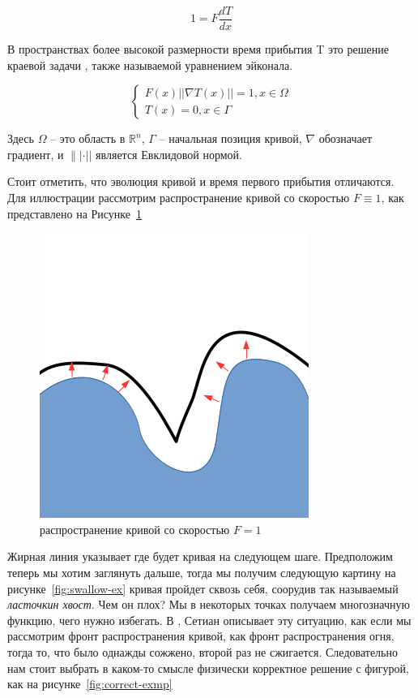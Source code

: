 \begin{equation*}
  1 = F \frac{dT}{dx}
\end{equation*}

В пространствах более высокой размерности время прибытия T это решение
краевой задачи , также называемой уравнением эйконала.

\begin{equation}
  \label{eq:eikonal}
  \left\{ \begin{matrix}
      F(x) || \nabla T(x) || = 1, x \in \Omega \\
      T(x) = 0, x \in \Gamma
    \end{matrix}\right.
\end{equation}

Здесь $\Omega$ -- это область в $\mathbb{R}^n$, $\Gamma$ -- начальная
позиция кривой, $\nabla$ обозначает градиент, и $\|| \cdot ||$ является
Евклидовой нормой.

Стоит отметить, что эволюция кривой и время первого прибытия
отличаются. Для иллюстрации рассмотрим распространение кривой со
скоростью $F \equiv 1$, как представлено на Рисунке~\ref{fig:prpgt-eik}

\begin{figure}[h]
  \centering
  \includegraphics[width=0.3\linewidth]{img/propagate_eikonal.png}
  \hfil \caption{распространение кривой со скоростью $F = 1$}
  \label{fig:prpgt-eik}

\end{figure}

Жирная линия указывает где будет кривая на следующем шаге.  Предположим
теперь мы хотим заглянуть дальше, тогда мы получим следующую картину
на рисунке~\ref{fig:swallow-ex} кривая пройдет сквозь себя, соорудив
так называемый \textit{ласточкин хвост}. Чем он плох? Мы в некоторых
точках получаем многозначную функцию, чего нужно избегать. В
\cite{S1999}, Сетиан описывает эту ситуацию, как если мы рассмотрим
фронт распространения кривой, как фронт распространения огня, тогда
то, что было однажды сожжено, второй раз не сжигается.  Следовательно
нам стоит выбрать в каком-то смысле физически корректное решение с
фигурой, как на рисунке~\ref{fig:correct-exmp}

